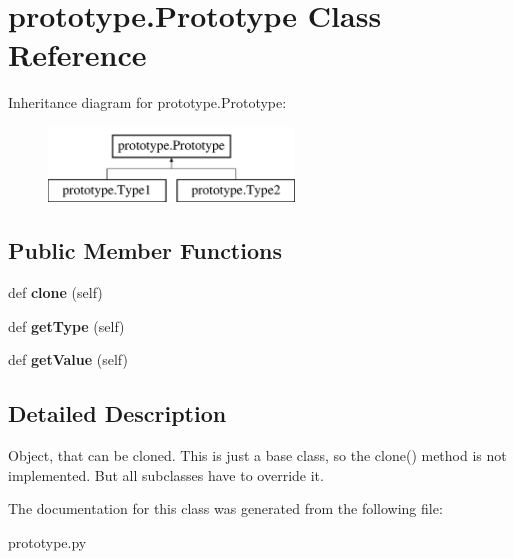 \hypertarget{classprototype_1_1_prototype}{}\section{prototype.\+Prototype Class Reference}
\label{classprototype_1_1_prototype}
Inheritance diagram for prototype.\+Prototype\+:\begin{figure}[H]
\begin{center}
\leavevmode
\includegraphics[height=2.000000cm]{classprototype_1_1_prototype}
\end{center}
\end{figure}
\subsection*{Public Member Functions}
\begin{DoxyCompactItemize}
\item 
\mbox{\label{classprototype_1_1_prototype_aa9ace38c2c392b1770e0d421e7435740}} 
def {\bfseries clone} (self)
\item 
\mbox{\label{classprototype_1_1_prototype_a9a805e5c947324964a491654407512cc}} 
def {\bfseries get\+Type} (self)
\item 
\mbox{\label{classprototype_1_1_prototype_aa41392dd1441dcca9942f61b6980d958}} 
def {\bfseries get\+Value} (self)
\end{DoxyCompactItemize}


\subsection{Detailed Description}
\begin{DoxyVerb}Object, that can be cloned.
This is just a base class, so the clone() method
is not implemented. But all subclasses have to
override it.
\end{DoxyVerb}
 

The documentation for this class was generated from the following file\+:\begin{DoxyCompactItemize}
\item 
prototype.\+py\end{DoxyCompactItemize}
